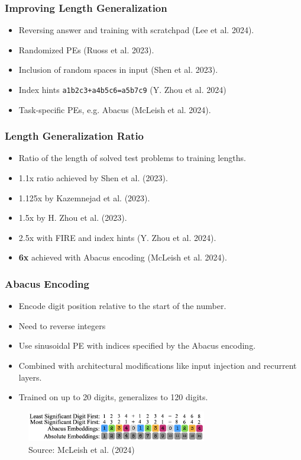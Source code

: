\documentclass[14pt,aspectratio=169]{beamer}
\theoremstyle{remark}
\begin{document}
\begin{frame}
    \frametitle{Improving Length Generalization}
    \begin{itemize}
        \item Reversing answer and training with scratchpad (Lee et al. 2024).
        \item Randomized PEs (Ruoss et al. 2023).
        \item Inclusion of random spaces in input (Shen et al. 2023).
        \item Index hints \texttt{a1b2c3+a4b5c6=a5b7c9} (Y. Zhou et al. 2024)
        \item Task-specific PEs, e.g. Abacus (McLeish et al. 2024).
    \end{itemize}
\end{frame}

\begin{frame}
    \frametitle{Length Generalization Ratio}
    \begin{itemize}
        \item Ratio of the length of solved test problems to training lengths.
        \item 1.1x ratio achieved by Shen et al. (2023).
        \item 1.125x by Kazemnejad et al. (2023).
        \item 1.5x by H. Zhou et al. (2023).
        \item 2.5x with FIRE and index hints (Y. Zhou et al. 2024).
        \item \textbf{6x} achieved with Abacus encoding (McLeish et al. 2024).
    \end{itemize}
\end{frame}

\begin{frame}
    \frametitle{Abacus Encoding}
    \begin{itemize}
        \item Encode digit position relative to the start of the number.
        \item Need to reverse integers
        \item Use sinusoidal PE with indices specified by the Abacus encoding.
        \item Combined with architectural modifications like input injection and recurrent layers.
        \item Trained on up to 20 digits, generalizes to 120 digits.
    \end{itemize}
    \begin{figure}
        \centering
        \includegraphics[width=0.7\textwidth]{fig/abacus.png}
        \caption{Source: McLeish et al. (2024)}
    \end{figure}
\end{frame}
\end{document}
